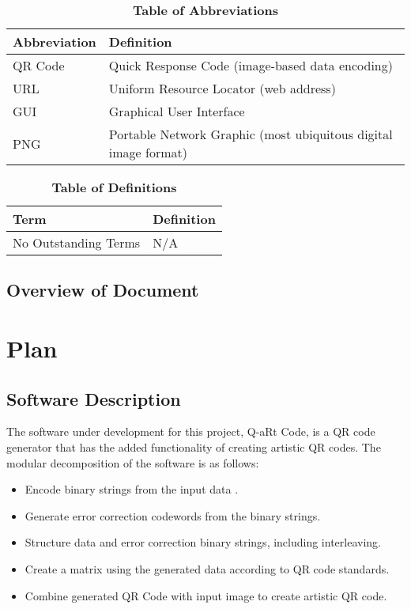 \documentclass[12pt, titlepage]{article}
\begin{document}
\begin{table}[hbp]
\caption{\textbf{Table of Abbreviations}} \label{Table}

\begin{tabularx}{\textwidth}{p{3cm}X}
\toprule
\textbf{Abbreviation} & \textbf{Definition} \\
\midrule
QR Code & Quick Response Code (image-based data encoding)\\
URL & Uniform Resource Locator (web address)\\
GUI & Graphical User Interface\\
PNG & Portable Network Graphic (most ubiquitous digital image format)\\
\bottomrule
\end{tabularx}

\end{table}

\begin{table}[!htbp]
\caption{\textbf{Table of Definitions}} \label{Table}

\begin{tabularx}{\textwidth}{p{3cm}X}
\toprule
\textbf{Term} & \textbf{Definition}\\
\midrule
No Outstanding Terms & N/A\\
\bottomrule
\end{tabularx}

\end{table}	

\subsection{Overview of Document}

\section{Plan}
	
\subsection{Software Description}
	The software under development for this project, Q-aRt Code, is a QR code 
	generator that has the added functionality of creating artistic QR codes. 
	The modular decomposition of the software is as follows:
	\begin{itemize}  
		\item Encode binary strings from the input data .
		\item Generate error correction codewords from the binary strings.
		\item Structure data and error correction binary strings, including 
		interleaving.
		\item Create a matrix using the generated data according to QR code 
		standards.
		\item Combine generated QR Code with input image to create artistic QR 
		code.
	\end{itemize}
\end{document}
